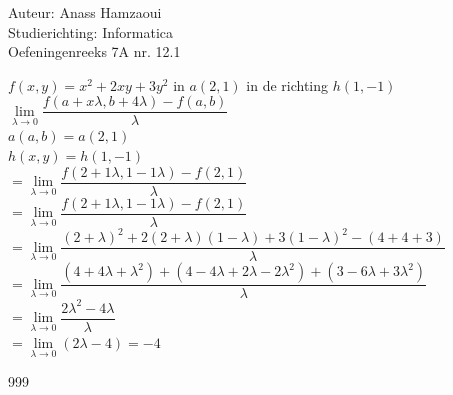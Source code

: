 \documentclass[a4paper]{article}
\begin{document}
  
\noindent \large Auteur: Anass Hamzaoui \\
\noindent \large Studierichting: Informatica\\
\noindent \large Oefeningenreeks 7A nr. 12.1\\

\medskip

\normalsize

$f(x,y) = x^2 + 2xy + 3y^2$ in $a(2,1)$ in de richting $h(1,-1)$\\

$\lim\limits_{\lambda \rightarrow 0} \dfrac{f(a+x \lambda , b+4\lambda) - f(a,b)}{\lambda} $\\

$a(a,b) = a(2,1)$\\

$h(x,y) = h(1,-1)$\\

$=\lim\limits_{\lambda \rightarrow 0} \dfrac{f(2+1\lambda, 1-1\lambda) - f(2,1)}{\lambda}$\\

$=\lim\limits_{\lambda \rightarrow 0} \dfrac{f(2+1\lambda, 1-1\lambda) - f(2,1)}{\lambda}$\\

$=\lim\limits_{\lambda \rightarrow 0} \dfrac{(2+\lambda)^2 + 2(2+\lambda)(1-\lambda) + 3(1-\lambda)^2 - (4+4+3)}{\lambda}$\\

$=\lim\limits_{\lambda \rightarrow 0} \dfrac{(4+4\lambda+\lambda^2)+(4-4\lambda+2\lambda-2\lambda^2)+(3-6\lambda+3\lambda^2)}{\lambda}$\\

$=\lim\limits_{\lambda \rightarrow 0} \dfrac{2\lambda^2-4\lambda}{\lambda}$\\

$=\lim\limits_{\lambda \rightarrow 0} (2\lambda -4) = -4$\\

\begin{thebibliography}{999}
\end{thebibliography}
\end{document}
